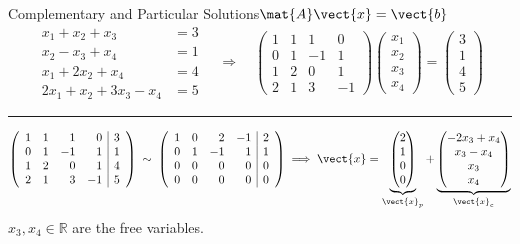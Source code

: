 \begin{frame}{Complementary and Particular Solutions\quad $\mat{A}\vect{x}=\vect{b}$}
\[
  \begin{aligned}
    x_1+x_2+x_3 &= 3\\
    x_2-x_3+x_4 &= 1\\
    x_1+2x_2+x_4 &= 4\\
    2x_1+x_2+3x_3-x_4 &= 5
  \end{aligned}
  \quad\Longrightarrow\quad
  \begin{pmatrix}
    1&1&1&0\\
    0&1&-1&1\\
    1&2&0&1\\
    2&1&3&-1
  \end{pmatrix}
  \begin{pmatrix}x_1\\x_2\\x_3\\x_4\end{pmatrix}
  =\begin{pmatrix}3\\1\\4\\5\end{pmatrix}
\]
\noindent\rule{\linewidth}{0.4pt}
\[
  \left(\begin{array}{rrrr|r}
    1&1&1&0&3\\
    0&1&-1&1&1\\
    1&2&0&1&4\\
    2&1&3&-1&5
  \end{array}\right)
  \;\sim\;
  \left(\begin{array}{rrrr|r}
    1&0&2&-1&2\\
    0&1&-1&1&1\\
    0&0&0&0&0\\
    0&0&0&0&0
  \end{array}\right)
  \;\Longrightarrow\;
  \vect{x}=\underbrace{\begin{pmatrix}2\\1\\0\\0\end{pmatrix}}_{\vect{x}_p}
  +\underbrace{\begin{pmatrix}
    -2x_3+x_4\\
    x_3-x_4\\
    x_3\\
    x_4
  \end{pmatrix}}_{\vect{x}_c}
\]
$x_3,x_4\in\mathbb{R}$ are the free variables. 
\end{frame}

